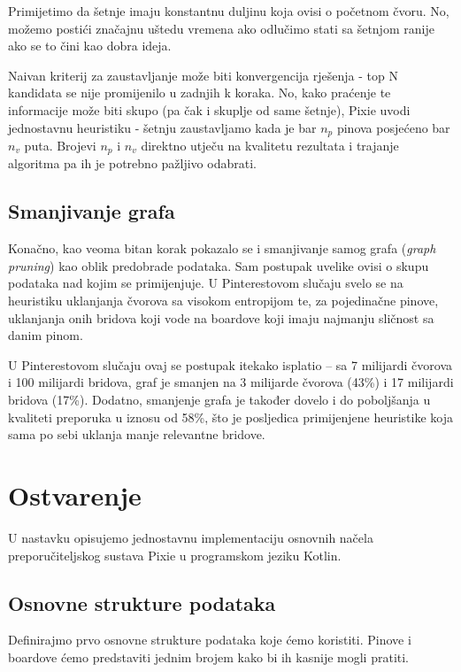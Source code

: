 \documentclass[times, utf8, seminar]{fer}
\begin{document}
Primijetimo da šetnje imaju konstantnu duljinu koja ovisi o početnom čvoru. No, možemo postići značajnu uštedu vremena ako odlučimo stati sa šetnjom ranije ako se to čini kao dobra ideja.

Naivan kriterij za zaustavljanje može biti konvergencija rješenja - top N kandidata se nije promijenilo u zadnjih k koraka. No, kako praćenje te informacije može biti skupo (pa čak i skuplje od same šetnje), Pixie uvodi jednostavnu heuristiku - šetnju zaustavljamo kada je bar $n_p$ pinova posjećeno bar $n_v$ puta. Brojevi $n_p$ i $n_v$ direktno utječu na kvalitetu rezultata i trajanje algoritma pa ih je potrebno pažljivo odabrati.

\section{Smanjivanje grafa}

Konačno, kao veoma bitan korak pokazalo se i smanjivanje samog grafa (\textit{graph pruning}) kao oblik predobrade podataka. Sam postupak uvelike ovisi o skupu podataka nad kojim se primijenjuje. U Pinterestovom slučaju svelo se na heuristiku uklanjanja čvorova sa visokom entropijom te, za pojedinačne pinove, uklanjanja onih bridova koji vode na boardove koji imaju najmanju sličnost sa danim pinom.

U Pinterestovom slučaju ovaj se postupak itekako isplatio -- sa 7 milijardi čvorova i 100 milijardi bridova, graf je smanjen na 3 milijarde čvorova (43\%) i 17 milijardi bridova (17\%). Dodatno, smanjenje grafa je također dovelo i do poboljšanja u kvaliteti preporuka u iznosu od 58\%, što je posljedica primijenjene heuristike koja sama po sebi uklanja manje relevantne bridove.

\chapter{Ostvarenje}

U nastavku opisujemo jednostavnu implementaciju osnovnih načela preporučiteljskog sustava Pixie u programskom jeziku Kotlin.

\section{Osnovne strukture podataka}

Definirajmo prvo osnovne strukture podataka koje ćemo koristiti. Pinove i boardove ćemo predstaviti jednim brojem kako bi ih kasnije mogli pratiti.
\end{document}
